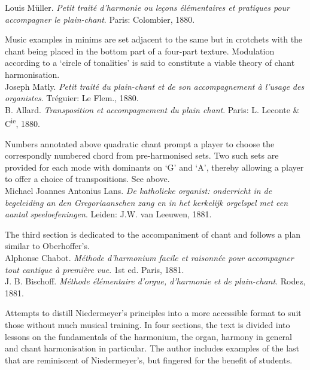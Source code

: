    \parindent=0pt
    \hangindent=0pt
  Louis Müller. \emph{Petit traité d'harmonie ou leçons élémentaires et pratiques pour accompagner le plain-chant}. Paris:  Colombier, 1880.

     \parindent=20pt
     \hangindent=20pt
     Music examples in minims are set adjacent to the same but in crotchets with the chant being placed in the bottom part of a four-part texture. Modulation according to a `circle of tonalities' is said to constitute a viable theory of chant harmonisation.\\

    \parindent=0pt
    \hangindent=0pt
  \covid{}Joseph Matly. \emph{Petit traité du plain-chant et de son accompagnement à l'usage des organistes}. Tréguier:  Le Flem., 1880. \\

    \parindent=0pt
    \hangindent=0pt
  B. Allard. \emph{Transposition et accompagnement du plain chant}. Paris:  L. Leconte \& C\textsuperscript{ie}, 1880.

     \parindent=20pt
     \hangindent=20pt
     Numbers annotated above quadratic chant prompt a player to choose the correspondly numbered chord from pre-harmonised sets. Two such sets are provided for each mode with dominants on `G' and `A', thereby allowing a player to offer a choice of transpositions. See  above.\\

    \parindent=0pt
    \hangindent=0pt
  Michael Joannes Antonius Lans. \emph{De katholieke organist: onderricht in de begeleiding an den Gregoriaanschen zang en in het kerkelijk orgelspel met een aantal speeloefeningen}. Leiden:  J.W. van Leeuwen, 1881.

     \parindent=20pt
     \hangindent=20pt
     The third section is dedicated to the accompaniment of chant and follows a plan similar to Oberhoffer's.\\

    \parindent=0pt
    \hangindent=0pt
  \covid{}Alphonse Chabot. \emph{Méthode d'harmonium facile et raisonnée pour accompagner tout cantique à première vue}. 1st ed. Paris, 1881. \\

    \parindent=0pt
    \hangindent=0pt
  J. B. Bischoff. \emph{Méthode élémentaire d'orgue, d'harmonie et de plain-chant}. Rodez, 1881.

     \parindent=20pt
     \hangindent=20pt
     Attempts to distill Niedermeyer's principles into a more accessible format to suit those without much musical training. In four sections, the text is divided into lessons on the fundamentals of the harmonium, the organ, harmony in general and chant harmonisation in particular. The author includes examples of the last that are reminiscent of Niedermeyer's, but fingered for the benefit of students.\\

